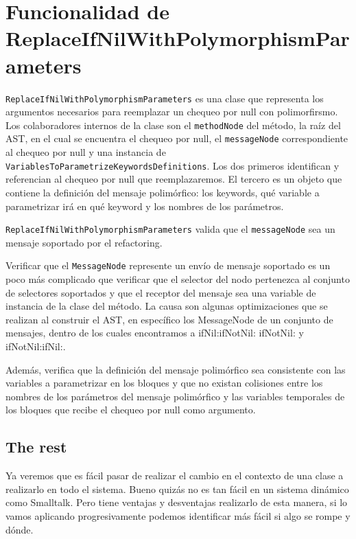 \section{Funcionalidad de ReplaceIfNilWithPolymorphismParameters}

\lstinline{ReplaceIfNilWithPolymorphismParameters} es una clase que representa los argumentos necesarios
para reemplazar un chequeo por null con polimorfirsmo. Los colaboradores internos de la clase son el
\lstinline{methodNode} del método, la raíz del AST, en el cual se encuentra el chequeo por null,
el \lstinline{messageNode} correspondiente al chequeo por null y una instancia de
\lstinline{VariablesToParametrizeKeywordsDefinitions}. Los dos primeros identifican y referencian al
chequeo por null que reemplazaremos. El tercero es un objeto que contiene la definición del 
mensaje polimórfico: los keywords, qué variable a parametrizar irá en qué keyword y los nombres de
los parámetros.

\lstinline{ReplaceIfNilWithPolymorphismParameters} valida que el \lstinline{messageNode} sea un mensaje
soportado por el refactoring.

Verificar que el \lstinline{MessageNode} represente un envío de mensaje soportado es un poco más 
complicado que verificar que el selector del nodo pertenezca al conjunto de selectores soportados
y que el receptor del mensaje sea una variable de instancia de la clase del método. La causa son algunas
optimizaciones que se realizan al construir el AST, en específico los MessageNode de un conjunto de mensajes,
dentro de los cuales encontramos a ifNil:ifNotNil: ifNotNil: y ifNotNil:ifNil:.




Además, verifica que la definición del mensaje polimórfico sea consistente con las variables a parametrizar
en los bloques y que no existan colisiones entre los nombres de los parámetros del mensaje polimórfico
y las variables temporales de los bloques que recibe el chequeo por null como argumento.






\subsection{The rest}

Ya veremos que es fácil pasar de realizar el cambio en el contexto de una clase a realizarlo en todo el sistema.
Bueno quizás no es tan fácil en un sistema dinámico como Smalltalk. Pero tiene ventajas y desventajas realizarlo
de esta manera, si lo vamos aplicando progresivamente podemos identificar más fácil si algo se rompe y dónde.



